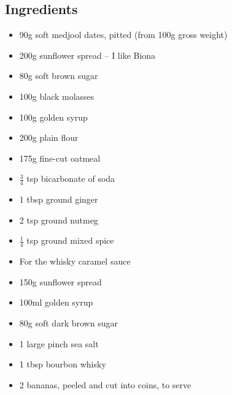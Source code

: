 \documentclass{book}
\begin{document}
\subsection*{Ingredients}
\begin{itemize}
\item 90g soft medjool dates, pitted (from 100g gross weight)
\item 200g sunflower spread – I like Biona
\item 80g soft brown sugar
\item 100g black molasses
\item 100g golden syrup
\item 200g plain flour
\item 175g fine-cut oatmeal
\item $\frac{3}{4}$ tsp bicarbonate of soda
\item 1 tbsp ground ginger
\item 2 tsp ground nutmeg
\item $\frac{1}{4}$ tsp ground mixed spice
\end{itemize}

\begin{itemize}
\item For the whisky caramel sauce
\item 150g sunflower spread
\item 100ml golden syrup
\item 80g soft dark brown sugar
\item 1 large pinch sea salt
\item 1 tbsp bourbon whisky
\item 2 bananas, peeled and cut into coins, to serve
\end{itemize}
\end{document}

